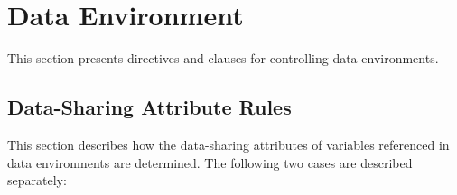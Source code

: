 %
%
%
%
%
%
%
%
%
%
%
%
%


\section{Data Environment}
\label{sec:Data Environment}
This section presents directives and clauses for controlling data environments.

\subsection{Data-Sharing Attribute Rules}
\label{subsec:Data-sharing Attribute Rules}
This section describes how the data-sharing attributes of variables referenced in
data environments are determined. The following two cases are described separately:

